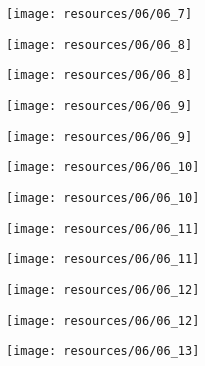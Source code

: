 \begin{frame}{ }
    \centering
    \texttt{[image: resources/06/06\_7]}
\end{frame}
\begin{frame}{ }
    \centering
    \texttt{[image: resources/06/06\_8]}
\end{frame}
\begin{frame}{ }
    \centering
    \texttt{[image: resources/06/06\_8]}
\end{frame}
\begin{frame}{ }
    \centering
    \texttt{[image: resources/06/06\_9]}
\end{frame}
\begin{frame}{ }
    \centering
    \texttt{[image: resources/06/06\_9]}
\end{frame}
\begin{frame}{ }
    \centering
    \texttt{[image: resources/06/06\_10]}
\end{frame}
\begin{frame}{ }
    \centering
    \texttt{[image: resources/06/06\_10]}
\end{frame}
\begin{frame}{ }
    \centering
    \texttt{[image: resources/06/06\_11]}
\end{frame}
\begin{frame}{ }
    \centering
    \texttt{[image: resources/06/06\_11]}
\end{frame}
\begin{frame}{ }
    \centering
    \texttt{[image: resources/06/06\_12]}
\end{frame}
\begin{frame}{ }
    \centering
    \texttt{[image: resources/06/06\_12]}
\end{frame}
\begin{frame}{ }
    \centering
    \texttt{[image: resources/06/06\_13]}
\end{frame}
